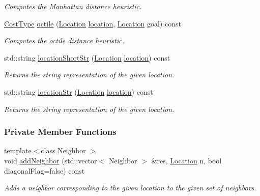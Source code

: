 \begin{DoxyCompactItemize}
\begin{DoxyCompactList}\small\item\em Computes the Manhattan distance heuristic. \end{DoxyCompactList}\item 
\hyperlink{structsb_1_1GridMap_a9121a2d39b061441b297927937e87083}{Cost\+Type} \hyperlink{structsb_1_1GridMap_aef89915e33582f9fc0bdca6956c6182a}{octile} (\hyperlink{structsb_1_1GridMap_aae073ca1668a117e37279473fff789d1}{Location} \hyperlink{structsb_1_1GridMap_af1f0641e6445bc37766d044a8f51f6ac}{location}, \hyperlink{structsb_1_1GridMap_aae073ca1668a117e37279473fff789d1}{Location} goal) const 
\begin{DoxyCompactList}\small\item\em Computes the octile distance heuristic. \end{DoxyCompactList}\item 
std\+::string \hyperlink{structsb_1_1GridMap_a79120b19d1ad899d4b9d0957ebe4a71c}{location\+Short\+Str} (\hyperlink{structsb_1_1GridMap_aae073ca1668a117e37279473fff789d1}{Location} \hyperlink{structsb_1_1GridMap_af1f0641e6445bc37766d044a8f51f6ac}{location}) const 
\begin{DoxyCompactList}\small\item\em Returns the string representation of the given location. \end{DoxyCompactList}\item 
std\+::string \hyperlink{structsb_1_1GridMap_a9f0cc1abdd32efa0c5d189906c1c4744}{location\+Str} (\hyperlink{structsb_1_1GridMap_aae073ca1668a117e37279473fff789d1}{Location} \hyperlink{structsb_1_1GridMap_af1f0641e6445bc37766d044a8f51f6ac}{location}) const 
\begin{DoxyCompactList}\small\item\em Returns the string representation of the given location. \end{DoxyCompactList}\end{DoxyCompactItemize}
\subsubsection*{Private Member Functions}
\begin{DoxyCompactItemize}
\item 
{\footnotesize template$<$class Neighbor $>$ }\\void \hyperlink{structsb_1_1GridMap_adf77e670d04b61c8e13615f70bedbd12}{add\+Neighbor} (std\+::vector$<$ Neighbor $>$ \&res, \hyperlink{structsb_1_1GridMap_aae073ca1668a117e37279473fff789d1}{Location} n, bool diagonal\+Flag=false) const 
\begin{DoxyCompactList}\small\item\em Adds a neighbor corresponding to the given location to the given set of neighbors. \end{DoxyCompactList}\end{DoxyCompactItemize}
